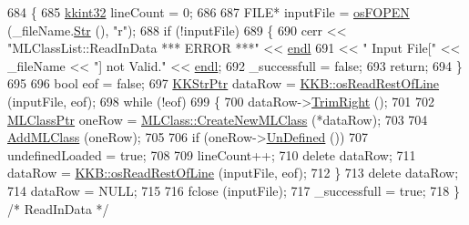 \begin{DoxyCode}
684 \{
685   \hyperlink{namespace_k_k_b_a8fa4952cc84fda1de4bec1fbdd8d5b1b}{kkint32}  lineCount = 0;
686 
687   FILE*  inputFile = \hyperlink{namespace_k_k_b_abf4050d2916ded8349dafadc80f0ecd1}{osFOPEN} (\_fileName.\hyperlink{class_k_k_b_1_1_k_k_str_ad574e6c0fe7f6ce1ba3ab0a8ce2fbd52}{Str} (), \textcolor{stringliteral}{"r"});
688   \textcolor{keywordflow}{if}  (!inputFile)
689   \{
690     cerr << \textcolor{stringliteral}{"MLClassList::ReadInData    *** ERROR ***"} << \hyperlink{namespace_k_k_b_ad1f50f65af6adc8fa9e6f62d007818a8}{endl}
691          << \textcolor{stringliteral}{"                Input File["} << \_fileName << \textcolor{stringliteral}{"] not Valid."} << \hyperlink{namespace_k_k_b_ad1f50f65af6adc8fa9e6f62d007818a8}{endl};
692     \_successfull = \textcolor{keyword}{false};
693     \textcolor{keywordflow}{return};
694   \}
695 
696   \textcolor{keywordtype}{bool} eof = \textcolor{keyword}{false};
697   \hyperlink{class_k_k_b_1_1_k_k_str}{KKStrPtr}  dataRow = \hyperlink{namespace_k_k_b_a88c95cee7b3dd5c93ab443b2ec20862c}{KKB::osReadRestOfLine} (inputFile, eof);
698   \textcolor{keywordflow}{while}  (!eof)
699   \{
700     dataRow->\hyperlink{class_k_k_b_1_1_k_k_str_aa912161f17871e2d6fec7bbac033221c}{TrimRight} ();
701 
702     \hyperlink{class_k_k_m_l_l_1_1_m_l_class}{MLClassPtr}  oneRow = \hyperlink{class_k_k_m_l_l_1_1_m_l_class_a9fd24c617c42d89afc92414575e00e9a}{MLClass::CreateNewMLClass} (*dataRow);
703 
704     \hyperlink{class_k_k_m_l_l_1_1_m_l_class_list_a40d1967d45d8c2b571a5107480be8df7}{AddMLClass} (oneRow);
705 
706     \textcolor{keywordflow}{if}  (oneRow->\hyperlink{class_k_k_m_l_l_1_1_m_l_class_add5b7120a94078e1dcd455ad1c103267}{UnDefined} ())
707       undefinedLoaded = \textcolor{keyword}{true};
708 
709     lineCount++;
710     \textcolor{keyword}{delete}  dataRow;
711     dataRow = \hyperlink{namespace_k_k_b_a88c95cee7b3dd5c93ab443b2ec20862c}{KKB::osReadRestOfLine} (inputFile, eof);
712   \}
713   \textcolor{keyword}{delete}  dataRow;
714   dataRow = NULL;
715 
716   fclose (inputFile);
717   \_successfull = \textcolor{keyword}{true};
718 \}  \textcolor{comment}{/* ReadInData */}
\end{DoxyCode}
